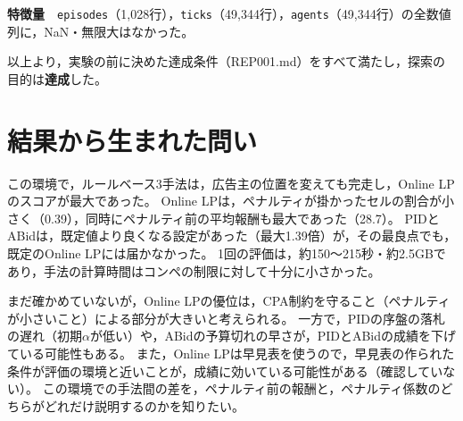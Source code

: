\documentclass[twocolumn, 10pt]{ujarticle}
\begin{document}
\textbf{特徴量}　\texttt{episodes}（1,028行），\texttt{ticks}（49,344行），\texttt{agents}（49,344行）の全数値列に，NaN・無限大はなかった。

以上より，実験の前に決めた達成条件（REP001.md）をすべて満たし，探索の目的は\textbf{達成}した。

\section{結果から生まれた問い}\label{sec:e-question}

この環境で，ルールベース3手法は，広告主の位置を変えても完走し，Online LPのスコアが最大であった。
Online LPは，ペナルティが掛かったセルの割合が小さく（0.39），同時にペナルティ前の平均報酬も最大であった（28.7）。
PIDとABidは，既定値より良くなる設定があった（最大1.39倍）が，その最良点でも，既定のOnline LPには届かなかった。
1回の評価は，約150〜215秒・約2.5GBであり，手法の計算時間はコンペの制限に対して十分に小さかった。

まだ確かめていないが，Online LPの優位は，CPA制約を守ること（ペナルティが小さいこと）による部分が大きいと考えられる。
一方で，PIDの序盤の落札の遅れ（初期$\alpha$が低い）や，ABidの予算切れの早さが，PIDとABidの成績を下げている可能性もある。
また，Online LPは早見表を使うので，早見表の作られた条件が評価の環境と近いことが，成績に効いている可能性がある（確認していない）。
この環境での手法間の差を，ペナルティ前の報酬と，ペナルティ係数のどちらがどれだけ説明するのかを知りたい。
\end{document}
